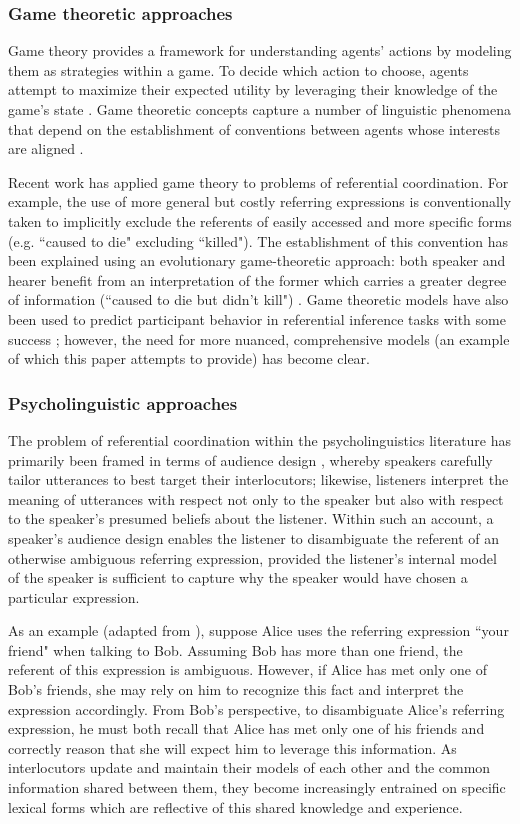 \documentclass[a4paper,11pt]{article}
\begin{document}
\subsubsection{Game theoretic approaches}
Game theory provides a framework for understanding agents' actions by modeling them as strategies within a game. To decide which action to choose, agents attempt to maximize their expected utility by leveraging their knowledge of the game's state \cite{benz2005}. Game theoretic concepts capture a number of linguistic phenomena that depend on the establishment of conventions between agents whose interests are aligned \cite{lewis1969}.

Recent work has applied game theory to problems of referential coordination. For example, the use of more general but costly referring expressions is conventionally taken to implicitly exclude the referents of easily accessed and more specific forms (e.g. ``caused to die" excluding ``killed"). The establishment of this convention has been explained using an evolutionary game-theoretic approach: both speaker and hearer benefit from an interpretation of the former which carries a greater degree of information (``caused to die but didn't kill") \cite{benz2005}. Game theoretic models have also been used to predict participant behavior in referential inference tasks with some success \cite{degen2012}; however, the need for more nuanced, comprehensive models (an example of which this paper attempts to provide) has become clear. 

\subsubsection{Psycholinguistic approaches}
The problem of referential coordination within the psycholinguistics literature has primarily been framed in terms of audience design \cite{clark1982}, whereby speakers carefully tailor utterances to best target their interlocutors; likewise, listeners interpret the meaning of utterances with respect not only to the speaker but also with respect to the speaker's presumed beliefs about the listener. Within such an account, a speaker's audience design enables the listener to disambiguate the referent of an otherwise ambiguous referring expression, provided the listener's internal model of the speaker is sufficient to capture why the speaker would have chosen a particular expression. 

As an example (adapted from \citeauthor{clark1982}), suppose Alice uses the referring expression ``your friend" when talking to Bob. Assuming Bob has more than one friend, the referent of this expression is ambiguous. However, if Alice has met only one of Bob's friends, she may rely on him to recognize this fact and interpret the expression accordingly. From Bob's perspective, to disambiguate Alice's referring expression, he must both recall that Alice has met only one of his friends and correctly reason that she will expect him to leverage this information. As interlocutors update and maintain their models of each other and the common information shared between them, they become increasingly entrained on specific lexical forms which are reflective of this shared knowledge and experience.
\end{document}
